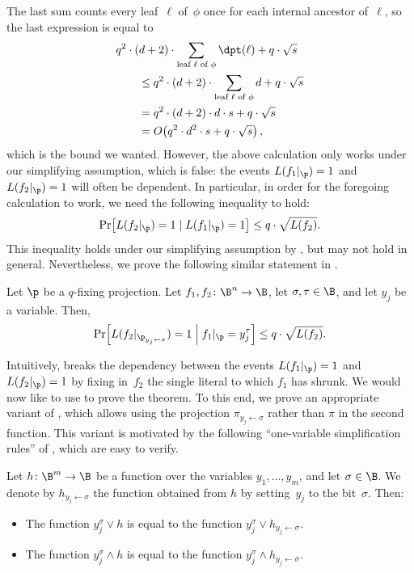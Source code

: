 The last sum counts every leaf~$\ell$ of~$\phi$ once for each
internal ancestor of~$\ell$, so the last expression is equal to
\begin{align*}
 & q^{2}\cdot(d+2)\cdot\sum_{\text{leaf \ensuremath{\ell} of \ensuremath{\phi}}}\dpt(\ell)+q\cdot\sqrt{s}\\
 & \qquad\le q^{2}\cdot(d+2)\cdot\sum_{\text{leaf \ensuremath{\ell} of \ensuremath{\phi}}}d+q\cdot\sqrt{s}\\
 & \qquad=q^{2}\cdot(d+2)\cdot d\cdot s+q\cdot\sqrt{s}\\
 & \qquad=O\!\left(q^{2}\cdot d^{2}\cdot s+q\cdot\sqrt{s}\right),
\end{align*}
which is the bound we wanted. However, the above calculation only
works under our simplifying assumption, which is false: the events
$L(f_{1}|_{\p})=1$ and $L(f_{2}|_{\p})=1$ will often be dependent.
In particular, in order for the foregoing calculation to work, we
need the following inequality to hold: 
\[
\Pr\!\left[L(f_{2}|_{\p})=1\mid L(f_{1}|_{\p})=1\right]\le q\cdot\sqrt{L(f_{2})}.
\]
This inequality holds under our simplifying assumption by ,
but may not hold in general. Nevertheless, we prove the following
similar statement in . 
\begin{lemma}
\label{lemma:shrinkage-with-conditioning}Let $\p$ be a $q$-fixing projection.
Let $f_{1},f_{2}\colon\B^{n}\to\B$, let $\sigma,\tau\in\B$, and
let $y_{j}$ be a variable. Then, 
\[
\Pr\!\left[L(f_{2}|_{\p_{y_{j}\gets\sigma}})=1\;\middle|\;f_{1}|_{\p}=y_{j}^{\tau}\right]\le q\cdot\sqrt{L(f_{2})}.
\]
\end{lemma}

Intuitively,  breaks the dependency
between the events $L(f_{1}|_{\p})=1$ and $L(f_{2}|_{\p})=1$ by
fixing in~$f_{2}$ the single literal to which $f_{1}$ has shrunk.
We would now like to use  to prove
the theorem. To this end, we prove an appropriate variant of ,
which allows using the projection $\pi_{y_{j}\gets\sigma}$ rather
than $\pi$ in the second function. This variant is motivated by the
following ``one-variable simplification rules'' of \cite{H98},
which are easy to verify. 
\begin{fact}
\label{fact:simplification-rules}Let $h\colon\B^{m}\to\B$ be a function
over the variables $y_{1},\ldots,y_{m}$, and let $\sigma\in\B$.
We denote by $h_{y_{j}\gets\sigma}$ the function obtained from $h$
by setting~$y_{j}$ to the bit~$\sigma$. Then: 
\begin{itemize}
\item The function $y_{j}^{\sigma}\vee h$ is equal to the function $y_{j}^{\sigma}\vee h_{y_{j}\gets\sigma}$. 
\item The function $y_{j}^{\sigma}\wedge h$ is equal to the function $y_{j}^{\sigma}\wedge h_{y_{j}\gets\overline{\sigma}}$. 
\end{itemize}
\end{fact}

